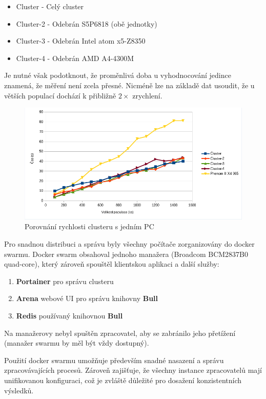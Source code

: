 \begin{itemize}
	\item Cluster - Celý cluster
	\item Cluster-2 - Odebrán S5P6818 (obě jednotky)
	\item Cluster-3 - Odebrán Intel atom x5-Z8350
	\item Cluster-4 - Odebrán AMD A4-4300M
\end{itemize}

Je nutné však podotknout, že proměnlivá doba u vyhodnocování jedince znamená, že měření není zcela přesné. Nicméně lze na základě dat usoudit, že u větších populací dochází k přibližně $2\times$ zrychlení.

\begin{figure}[H]
	\centering
	\includegraphics[scale=0.7]{benchmarkCluster}
	\caption{Porovnání rychlosti clusteru s jedním PC}
	\label{fig:benchmarkcluster}
\end{figure}

Pro snadnou distribuci a správu byly všechny počítače zorganizovány do docker swarmu. Docker swarm obsahoval jednoho manažera (Broadcom BCM2837B0 quad-core), který zároveň spouštěl klientskou aplikaci a další služby:

\begin{enumerate}
	\item \textbf{Portainer} pro správu clusteru
	\item \textbf{Arena} webové UI pro správu knihovny \textbf{Bull}
	\item \textbf{Redis} používaný knihovnou \textbf{Bull}
\end{enumerate}

Na manažerovy nebyl spuštěn zpracovatel, aby se zabránilo jeho přetížení (manažer swarmu by měl být vždy dostupný).

Použití docker swarmu umožňuje především snadné nasazení a správu zpracovávajících procesů. Zároveň zajišťuje, že všechny instance zpracovatelů mají unifikovanou konfiguraci, což je zvláště důležité pro dosažení konzistentních výsledků.

